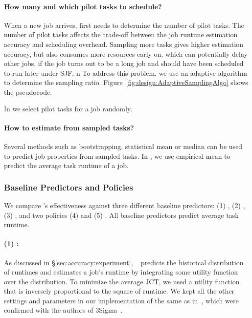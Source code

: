 \paragraph{How many and which pilot tasks to schedule?}
When a new job arrives, \name first needs to determine the number of
pilot tasks.  The number of pilot tasks affects the trade-off between
the job runtime estimation accuracy and scheduling overhead.  Sampling
more tasks gives higher estimation accuracy, 
but also consumes more resources early on, which can potentially delay other
jobs, if the job turns out to be a long job and should have been scheduled to
run later under SJF.
n%
{To address this problem, we use an adaptive algorithm to determine the
sampling ratio. Figure~\ref{fig:design:AdaptiveSamplingAlgo} shows the pseudocode.}


In \slearn we select pilot tasks for a job randomly.


\paragraph{How to estimate from sampled tasks?}  Several methods such
as bootstrapping, statistical mean or median can be used to predict job
properties from sampled tasks.  In \gs, we use empirical mean to
predict the average task runtime of a job.  

\subsubsection{Baseline Predictors and Policies}
\label{sec:design:baselines}

We compare \slearn's effectiveness against three different baseline predictors:
(1) \primarybasepredict,  (2) \pointestimator , (3) \oracle , and two policies (4) \las
and (5) \fifo. All baseline  predictors predict average task runtime.

\paragraph{(1) \primarybasepredict: } 
As discussed in \S\ref{sec:accuracy:experiment},
\primarybasepredict~\cite{3Sigma} 
predicts the historical distribution of runtimes 
and estimates a job's runtime by integrating some utility function over the distribution.
To minimize the average JCT, we used a utility function that is inversely
proportional to the square of runtime.  We kept all the other settings
and parameters in our implementation of \primarybasepredict the same 
as in~\cite{3Sigma}, which were confirmed with the authors of
3Sigma~\cite{personalCommunication:JunWoo}.

